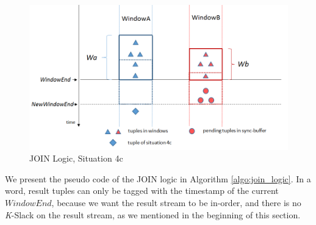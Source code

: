 \documentclass[a4paper, 11pt, twoside]{report}
\begin{document}
\begin{figure}[h]
\centering
\includegraphics[scale=0.55]{join_logic_4}
\caption{JOIN Logic, Situation 4c\label{fig:join_logic_4}}
\end{figure}

We present the pseudo code of the JOIN logic in Algorithm \ref{algo:join_logic}. In a word, result tuples can only be tagged with the timestamp of the current $WindowEnd$, because we want the result stream to be in-order, and there is no \textit{K}-Slack on the result stream, as we mentioned in the beginning of this section.\\
\end{document}
